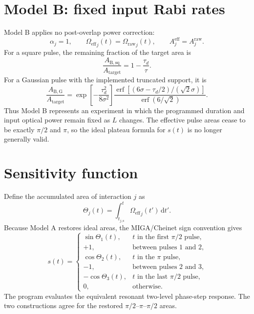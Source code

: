 \documentclass[11pt,a4paper]{article}
\newcommand{\dd}{\,\mathrm{d}}
\newcommand{\taud}{\tau_{d}}
\newcommand{\Oraw}{\Omega_{\mathrm{raw}}}
\newcommand{\Oeff}{\Omega_{\mathrm{eff}}}
\begin{document}
\section{Model B: fixed input Rabi rates}

Model B applies no post-overlap power correction:
\begin{equation}
 \alpha_j=1,
 \qquad
 {\Oeff}_j(t)={\Oraw}_j(t),
 \qquad
 A_j^{\mathrm{eff}}=A_j^{\mathrm{raw}}.
 \label{eq:model-b}
\end{equation}
For a square pulse, the remaining fraction of the target area is
\begin{equation}
 \frac{A_{\mathrm{B,sq}}}{A_{\mathrm{target}}}
 =1-\frac{\taud}{\tau}.
 \label{eq:model-b-square}
\end{equation}
For a Gaussian pulse with the implemented truncated support, it is
\begin{equation}
 \frac{A_{\mathrm{B,G}}}{A_{\mathrm{target}}}
 =\exp\!\left[-\frac{\taud^2}{8\sigma^2}\right]
 \frac{\operatorname{erf}\!\left[(6\sigma-\taud/2)/(\sqrt{2}\sigma)\right]}
 {\operatorname{erf}(6/\sqrt{2})}.
 \label{eq:model-b-gaussian}
\end{equation}
Thus Model B represents an experiment in which the programmed duration and input optical power remain fixed as $L$ changes. The effective pulse areas cease to be exactly $\pi/2$ and $\pi$, so the ideal plateau formula for $s(t)$ is no longer generally valid.

\section{Sensitivity function}

Define the accumulated area of interaction $j$ as
\begin{equation}
 \Theta_j(t)=\int_{t_{j,\mathrm{s}}}^{t}{\Oeff}_j(t')\dd t'.
\end{equation}
Because Model A restores ideal areas, the MIGA/Cheinet sign convention gives
\begin{equation}
s(t)=
\begin{cases}
 \sin\Theta_1(t), & t\text{ in the first }\pi/2\text{ pulse},\\
 +1, & \text{between pulses 1 and 2},\\
 \cos\Theta_2(t), & t\text{ in the }\pi\text{ pulse},\\
 -1, & \text{between pulses 2 and 3},\\
 -\cos\Theta_3(t), & t\text{ in the last }\pi/2\text{ pulse},\\
 0, & \text{otherwise}.
\end{cases}
\label{eq:sensitivity}
\end{equation}
The program evaluates the equivalent resonant two-level phase-step response. The two constructions agree for the restored $\pi/2$--$\pi$--$\pi/2$ areas.
\end{document}
